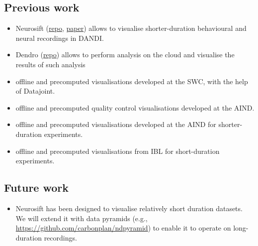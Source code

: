 \subsection{Previous work}

\begin{itemize}

    \item Neurosift
        (\href{https://github.com/flatironinstitute/neurosift}{repo},
        \href{https://joss.theoj.org/papers/10.21105/joss.06590}{paper}) allows to
    visualise shorter-duration behavioural and neural recordings in DANDI.

    \item Dendro (\href{https://github.com/magland/dendro}{repo}) allows to
    perform analysis on the cloud and visualise the results of such analysis

    \item offline and precomputed visualisations developed at the SWC, with the
    help of Datajoint.

    \item offline and precomputed quality control visualisations developed at
    the AIND.

    \item offline and precomputed visualisations developed at the AIND for
    shorter-duration experiments.

    \item offline and precomputed visualisations from IBL for short-duration
    experiments.

\end{itemize}

\subsection{Future work}

\begin{itemize}

    \item Neurosift has been designed to visualise relatively short duration
    datasets. We will extend it with data pyramids (e.g.,
    \url{https://github.com/carbonplan/ndpyramid}) to enable it to operate on
    long-duration recordings.

\end{itemize}


